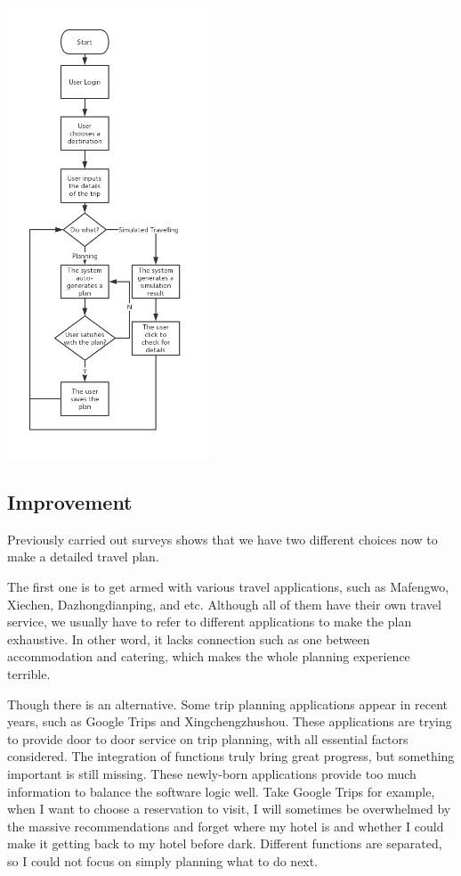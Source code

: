\documentclass[10pt]{article}
\begin{document}
\begin{center}
  \includegraphics[width=6cm]{test.png}
\end{center}

\subsection{Improvement}
Previously carried out surveys shows that we have two different choices now to make a detailed travel plan.

The first one is to get armed with various travel applications, such as Mafengwo, Xiechen, Dazhongdianping, and etc. Although all of them have their own travel service, we usually have to 
refer to different applications to make the plan exhaustive. In other word, it lacks connection such as one between accommodation and catering, which makes the whole planning experience terrible. 

Though there is an alternative. Some trip planning applications appear in recent years, such as Google Trips and Xingchengzhushou. These applications are trying to provide door to door service on trip planning, with all essential factors considered. The integration of functions truly bring great progress, but something important is still missing. These newly-born applications provide too much information to balance the software logic well. Take Google Trips for example, when I want to choose a reservation to visit, I will sometimes be overwhelmed by the massive recommendations and forget where my hotel is and whether I could make it getting back to my hotel before dark. Different functions are separated, so I could not focus on simply planning what to do next. 
\end{document}
